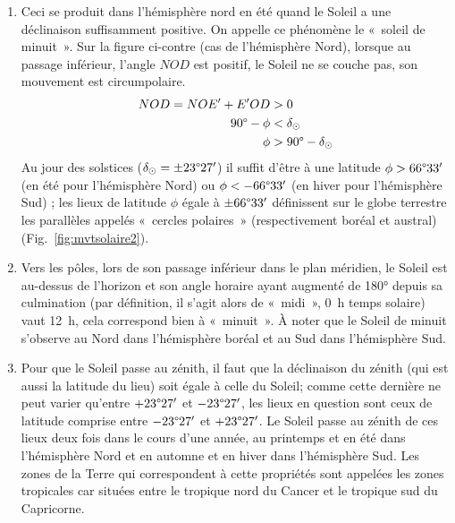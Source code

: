 \documentclass[a4paper,10pt]{report}
\renewcommand{\deg}{\ensuremath{\degree}}
\begin{document}
\begin{Answer}
\begin{enumerate}
  \item Ceci se produit dans l'hémisphère nord en été quand le Soleil
    a une déclinaison suffisamment positive. On appelle ce phénomène
    le «~soleil de minuit~». Sur la figure ci-contre (cas de
    l'hémisphère Nord), lorsque au passage inférieur, l'angle $NOD$
    est positif, le Soleil ne se couche pas, son mouvement est
    circumpolaire.
    \begin{align*}
      NOD = NOE' + E'OD &> 0 \\
      90\deg - \phi &< \delta_{\odot} \\
      \phi &> 90\deg - \delta_{\odot}
    \end{align*}
    Au jour des solstices ($\delta_{\odot} = \pm 23\deg27'$) il
    suffit d'être à une latitude $\phi > 66\deg33'$ (en été pour
    l'hémisphère Nord) ou $\phi < - 66\deg33'$ (en hiver pour
    l'hémisphère Sud) ; les lieux de latitude $\phi$ égale à $\pm
    66\deg33'$ définissent sur le globe terrestre les parallèles
    appelés «~cercles polaires~» (respectivement boréal et austral)
    (Fig.~\ref{fig:mvtsolaire2}).

  \item Vers les pôles, lors de son passage inférieur dans le plan
    méridien, le Soleil est au-dessus de l'horizon et son angle
    horaire ayant augmenté de 180° depuis sa culmination (par
    définition, il s'agit alors de «~midi~», 0~h temps solaire) vaut
    12~h, cela correspond bien à «~minuit~». À noter que le Soleil de
    minuit s'observe au Nord dans l'hémisphère boréal et au Sud dans
    l'hémisphère Sud.

  \item Pour que le Soleil passe au zénith, il faut que la déclinaison
    du zénith (qui est aussi la latitude du lieu) soit égale à celle
    du Soleil; comme cette dernière ne peut varier qu'entre
    $+23\deg27'$ et $-23\deg27'$, les lieux en question sont ceux
    de latitude comprise entre $-23\deg27'$ et $+23\deg27'$. Le
    Soleil passe au zénith de ces lieux deux fois dans le cours d'une
    année, au printemps et en été dans l'hémisphère Nord et en automne
    et en hiver dans l'hémisphère Sud. Les zones de la Terre qui
    correspondent à cette propriétés sont appelées les zones
    tropicales car situées entre le tropique nord du Cancer et le
    tropique sud du Capricorne.


\end{enumerate}
\end{Answer}
\end{document}
